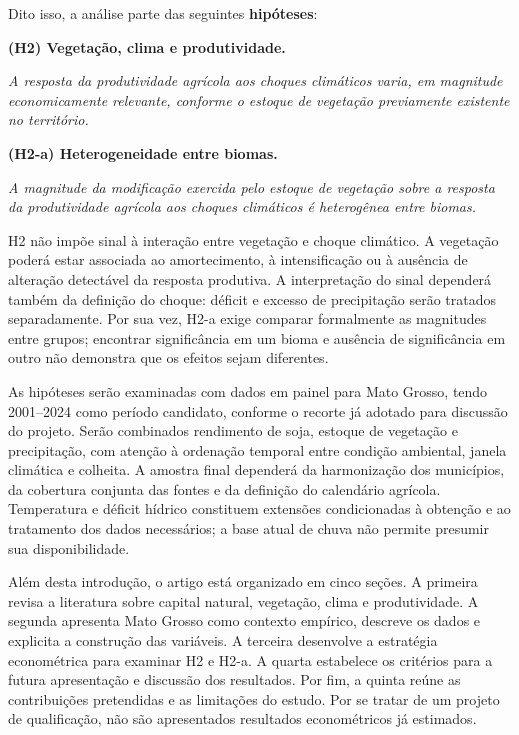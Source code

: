 \medskip
Dito isso, a análise parte das seguintes \textbf{hipóteses}:


\medskip
\noindent\textbf{(H2) Vegetação, clima e produtividade.}

\noindent\emph{A resposta da produtividade agrícola aos choques climáticos varia, em magnitude economicamente relevante, conforme o estoque de vegetação previamente existente no território.}

\medskip
\noindent\textbf{(H2-a) Heterogeneidade entre biomas.}

\noindent\emph{A magnitude da modificação exercida pelo estoque de vegetação sobre a resposta da produtividade agrícola aos choques climáticos é heterogênea entre biomas.}

\medskip
H2 não impõe sinal à interação entre vegetação e choque climático. A vegetação poderá estar associada ao amortecimento, à intensificação ou à ausência de alteração detectável da resposta produtiva. A interpretação do sinal dependerá também da definição do choque: déficit e excesso de precipitação serão tratados separadamente. Por sua vez, H2-a exige comparar formalmente as magnitudes entre grupos; encontrar significância em um bioma e ausência de significância em outro não demonstra que os efeitos sejam diferentes.

As hipóteses serão examinadas com dados em painel para Mato Grosso, tendo 2001--2024 como período candidato, conforme o recorte já adotado para discussão do projeto. Serão combinados rendimento de soja, estoque de vegetação e precipitação, com atenção à ordenação temporal entre condição ambiental, janela climática e colheita. A amostra final dependerá da harmonização dos municípios, da cobertura conjunta das fontes e da definição do calendário agrícola. Temperatura e déficit hídrico constituem extensões condicionadas à obtenção e ao tratamento dos dados necessários; a base atual de chuva não permite presumir sua disponibilidade.

Além desta introdução, o artigo está organizado em cinco seções. A primeira revisa a literatura sobre capital natural, vegetação, clima e produtividade. A segunda apresenta Mato Grosso como contexto empírico, descreve os dados e explicita a construção das variáveis. A terceira desenvolve a estratégia econométrica para examinar H2 e H2-a. A quarta estabelece os critérios para a futura apresentação e discussão dos resultados. Por fim, a quinta reúne as contribuições pretendidas e as limitações do estudo. Por se tratar de um projeto de qualificação, não são apresentados resultados econométricos já estimados.
